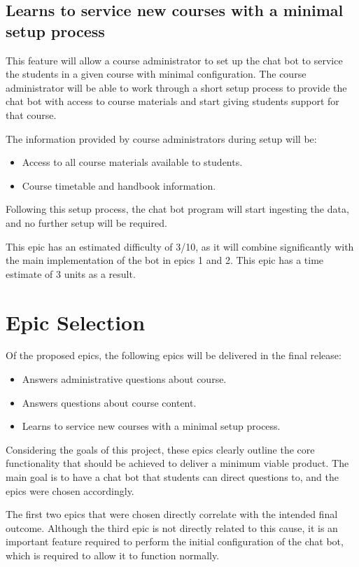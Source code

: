 \documentclass{article}
\begin{document}
\subsection{Learns to service new courses with a minimal setup process}

This feature will allow a course administrator to set up the chat bot to service the students in a given course with minimal configuration. The course administrator will be able to work through a short setup process to provide the chat bot with access to course materials and start giving students support for that course. 

The information provided by course administrators during setup will be:
\begin{itemize}
  \item Access to all course materials available to students.
  \item Course timetable and handbook information.
\end{itemize}

Following this setup process, the chat bot program will start ingesting the data, and no further setup will be required.

This epic has an estimated difficulty of 3/10, as it will combine significantly with the main implementation of the bot in epics 1 and 2. This epic has a time estimate of 3 units as a result. 


\section{Epic Selection}

Of the proposed epics, the following epics will be delivered in the final release:
\begin{itemize}
  \item Answers administrative questions about course.
  \item Answers questions about course content.
  \item Learns to service new courses with a minimal setup process.
\end{itemize}

Considering the goals of this project, these epics clearly outline the core functionality that should be achieved to deliver a minimum viable product. The main goal is to have a chat bot that students can direct questions to, and the epics were chosen accordingly.

The first two epics that were chosen directly correlate with the intended final outcome. Although the third epic is not directly related to this cause, it is an important feature required to perform the initial configuration of the chat bot, which is required to allow it to function normally.
\end{document}
